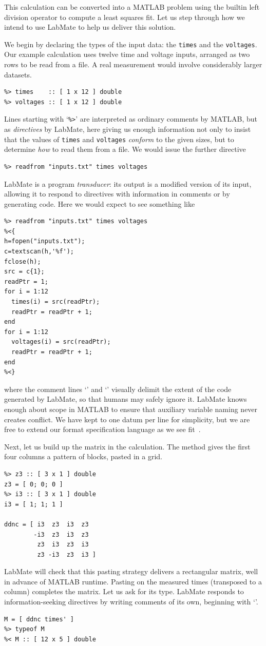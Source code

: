 \documentclass{IMEKO2024}
\newcommand{\pct}{\texttt{\symbol{37}}}
\newcommand{\res}{\texttt{\symbol{60}}}
\newcommand{\lcb}{\texttt{\symbol{123}}}
\newcommand{\rcb}{\texttt{\symbol{125}}}
\newcommand{\bsl}{\texttt{\symbol{92}}}
\newcommand{\remph}{\emph}
\begin{document}
This calculation can be converted into a MATLAB problem using the
builtin left division operator {\bsl} to compute a
least squares fit. Let us step through how we intend to use LabMate to
help us deliver this solution.

We begin by declaring the types of the input data: the \texttt{times} and the \texttt{voltages}. Our example calculation uses twelve time and voltage inputs, arranged as two rows to be read from a file. A real measurement would involve considerably larger datasets.
\begin{verbatim}
%> times    :: [ 1 x 12 ] double
%> voltages :: [ 1 x 12 ] double
\end{verbatim}
Lines starting with `\texttt{\%>}' are interpreted as ordinary comments by MATLAB, but as \remph{directives} by LabMate, here giving us enough information not only to insist that the values of \texttt{times} and \texttt{voltages} \remph{conform} to the given sizes, but to determine \remph{how} to read them from a file. We would issue the further directive
\begin{verbatim}
%> readfrom "inputs.txt" times voltages
\end{verbatim}
LabMate is a program \remph{transducer}: its output is a modified version of its input, allowing it to respond to directives with information in comments or by generating code. Here we would expect to see something like
\begin{verbatim}
%> readfrom "inputs.txt" times voltages
%<{
h=fopen("inputs.txt");
c=textscan(h,'%f');
fclose(h);
src = c{1};
readPtr = 1;
for i = 1:12
  times(i) = src(readPtr);
  readPtr = readPtr + 1;
end
for i = 1:12
  voltages(i) = src(readPtr);
  readPtr = readPtr + 1;
end
%<}
\end{verbatim}
where the comment lines `\pct\res\lcb' and `\pct\res\rcb' visually delimit the extent of the code generated by LabMate, so that humans may safely ignore it. LabMate knows enough about scope in MATLAB to ensure that auxiliary variable naming never creates conflict. We have kept to one datum per line for simplicity, but we are free to extend our format specification language as we see fit~\cite{mgen}.

Next, let us build up the matrix in the calculation. The method gives the first four columns a pattern of blocks, pasted in a grid.
\begin{verbatim}
%> z3 :: [ 3 x 1 ] double
z3 = [ 0; 0; 0 ]
%> i3 :: [ 3 x 1 ] double
i3 = [ 1; 1; 1 ]

ddnc = [ i3  z3  i3  z3
        -i3  z3  i3  z3
         z3  i3  z3  i3
         z3 -i3  z3  i3 ]
\end{verbatim}
LabMate will check that this pasting strategy delivers a rectangular matrix, well in advance of MATLAB runtime. Pasting on the measured times (transposed to a column) completes the matrix. Let us ask for its type. LabMate responds to information-seeking directives by writing comments of its own, beginning with `\pct\res'.
\begin{verbatim}
M = [ ddnc times' ]
%> typeof M
%< M :: [ 12 x 5 ] double
\end{verbatim}
\end{document}

